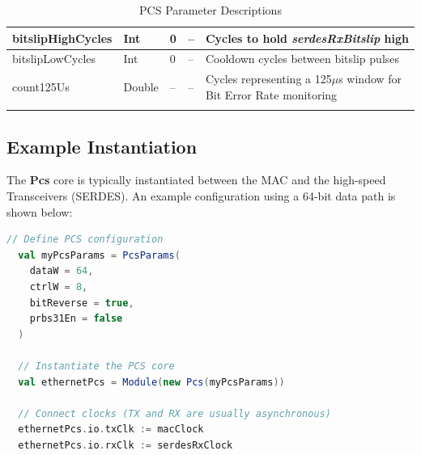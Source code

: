 \begin{longtable}[H]{
    | p{}
    | p{}
    | p{}
    | p{}
    | p{} |
  }
  bitslipHighCycles & Int & 0       & --      & Cycles to hold \textit{serdesRxBitslip} high \\ \hline
  bitslipLowCycles  & Int & 0       & --      & Cooldown cycles between bitslip pulses \\ \hline

  count125Us    & Double  & --      & --      & Cycles representing a 125$\mu$s window for Bit Error Rate monitoring \\ \hline

  \caption{PCS Parameter Descriptions}\label{table:params}
\end{longtable}

\subsection{Example Instantiation}

The \textbf{Pcs} core is typically instantiated between the MAC and the high-speed Transceivers (SERDES). An example configuration using a 64-bit data path is shown below:

\begin{lstlisting}[language=Scala]
  // Define PCS configuration
  val myPcsParams = PcsParams(
    dataW = 64,
    ctrlW = 8,
    bitReverse = true,
    prbs31En = false
  )

  // Instantiate the PCS core
  val ethernetPcs = Module(new Pcs(myPcsParams))
  
  // Connect clocks (TX and RX are usually asynchronous)
  ethernetPcs.io.txClk := macClock
  ethernetPcs.io.rxClk := serdesRxClock
\end{lstlisting}